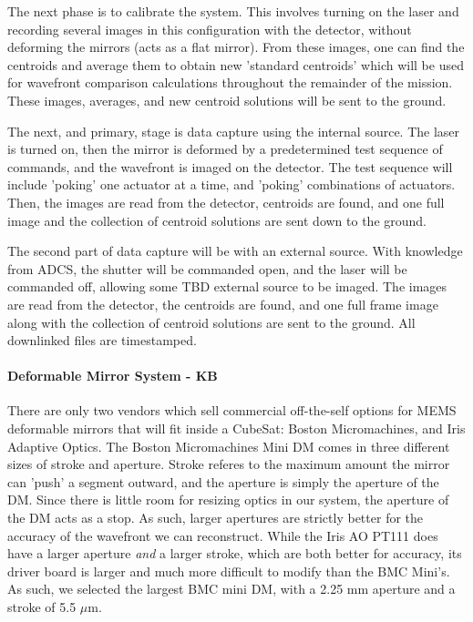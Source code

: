 \documentclass[12pt]{article}
\begin{document}
The next phase is to calibrate the system. This involves turning on the laser and recording several images in this configuration with the detector, without deforming the mirrors (acts as a flat mirror). From these images, one can find the centroids and average them to obtain new 'standard centroids' which will be used for wavefront comparison calculations throughout the remainder of the mission. These images, averages, and new centroid solutions will be sent to the ground.

The next, and primary, stage is data capture using the internal source. The laser is turned on, then the mirror is deformed by a predetermined test sequence of commands, and the wavefront is imaged on the detector. The test sequence will include 'poking' one actuator at a time, and 'poking' combinations of actuators. Then, the images are read from the detector, centroids are found, and one full image and the collection of centroid solutions are sent down to the ground.

The second part of data capture will be with an external source. With knowledge from ADCS, the shutter will be commanded open, and the laser will be commanded off, allowing some TBD external source to be imaged. The images are read from the detector, the centroids are found, and one full frame image along with the collection of centroid solutions are sent to the ground. All downlinked files are timestamped.

\paragraph{Deformable Mirror System - KB}

There are only two vendors which sell commercial off-the-self options for MEMS deformable mirrors that will fit inside a CubeSat: Boston Micromachines, and Iris Adaptive Optics. The Boston Micromachines Mini DM comes in three different sizes of stroke and aperture. Stroke
referes to the maximum amount the mirror can 'push' a segment outward, and the aperture is simply the aperture of the DM. Since there is little room for resizing optics in our system, the aperture of the DM
acts as a stop. As such, larger apertures are strictly better for the accuracy of the wavefront we can reconstruct. While the Iris AO PT111 does have a larger aperture \emph{and} a larger stroke, which are both
better for accuracy, its driver board is larger and much more difficult to modify than the BMC Mini's. As such, we selected the largest BMC mini DM, with a 2.25 mm aperture and a stroke of 5.5 $\mu \text{m}$.
\end{document}
